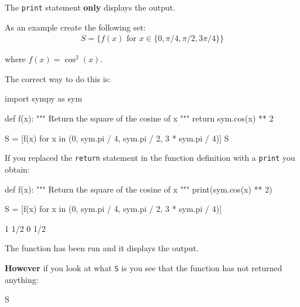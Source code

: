 The \texttt{print} statement \textbf{only} displays the output.


As an example create the following set:
\begin{equation*}
\begin{split}
    S = \{f(x)\text{ for }x \in \{0, \pi / 4, \pi / 2, 3\pi / 4\}\}
\end{split}
\end{equation*}

where \(f(x)= \cos^2(x)\).


The correct way to do this is:




\begin{pyin}
import sympy as sym


def f(x):
    """
    Return the square of the cosine of x
    """
    return sym.cos(x) ** 2


S = [f(x) for x in (0, sym.pi / 4, sym.pi / 2, 3 * sym.pi / 4)]
S
\end{pyin}





\begin{raw}
[1, 1/2, 0, 1/2]
\end{raw}





If you replaced the \texttt{return} statement in the function definition with a
\texttt{print} you obtain:




\begin{pyin}
def f(x):
    """
    Return the square of the cosine of x
    """
    print(sym.cos(x) ** 2)


S = [f(x) for x in (0, sym.pi / 4, sym.pi / 2, 3 * sym.pi / 4)]
\end{pyin}





\begin{raw}
1
1/2
0
1/2
\end{raw}





The function has been run and it displays the output.


\textbf{However} if you look at what \texttt{S} is you see that the function has not returned
anything:




\begin{pyin}
S
\end{pyin}





